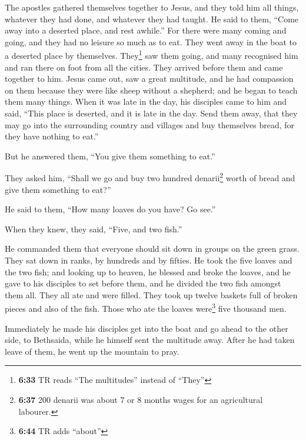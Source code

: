  The apostles gathered themselves together to Jesus, and
they told him all things, whatever they had done, and whatever they had
taught.  He said to them, ``Come away into a deserted
place, and rest awhile.'' For there were many coming and going, and they
had no leisure so much as to eat.  They went away in the
boat to a deserted place by themselves.  They\footnote{\textbf{6:33}
  TR reads ``The multitudes'' instead of ``They''} saw them going, and
many recognised him and ran there on foot from all the cities. They
arrived before them and came together to him.  Jesus came
out, saw a great multitude, and he had compassion on them because they
were like sheep without a shepherd; and he began to teach them many
things.  When it was late in the day, his disciples came
to him and said, ``This place is deserted, and it is late in the day.
 Send them away, that they may go into the surrounding
country and villages and buy themselves bread, for they have nothing to
eat.''

 But he answered them, ``You give them something to
eat.''

They asked him, ``Shall we go and buy two hundred denarii\footnote{\textbf{6:37}
  200 denarii was about 7 or 8 months wages for an agricultural
  labourer.} worth of bread and give them something to eat?''

 He said to them, ``How many loaves do you have? Go
see.''

When they knew, they said, ``Five, and two fish.''

 He commanded them that everyone should sit down in
groups on the green grass.  They sat down in ranks, by
hundreds and by fifties.  He took the five loaves and the
two fish; and looking up to heaven, he blessed and broke the loaves, and
he gave to his disciples to set before them, and he divided the two fish
amongst them all.  They all ate and were filled.
 They took up twelve baskets full of broken pieces and
also of the fish.  Those who ate the loaves
were\footnote{\textbf{6:44} TR adds ``about''} five thousand men.

 Immediately he made his disciples get into the boat and
go ahead to the other side, to Bethsaida, while he himself sent the
multitude away.  After he had taken leave of them, he
went up the mountain to pray.


